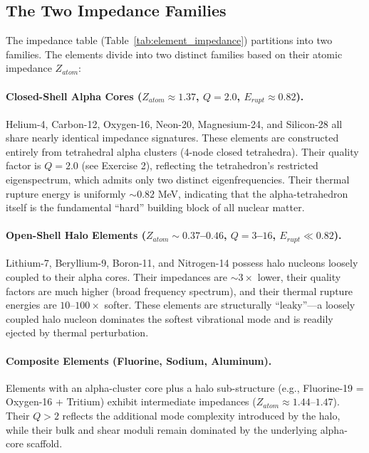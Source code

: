 \subsection{The Two Impedance Families}

The impedance table (Table~\ref{tab:element_impedance}) partitions into two families. The elements divide into two distinct families based on their atomic impedance $Z_{atom}$:

\paragraph{Closed-Shell Alpha Cores ($Z_{atom} \approx 1.37$, $Q = 2.0$, $E_{rupt} \approx 0.82$).}
Helium-4, Carbon-12, Oxygen-16, Neon-20, Magnesium-24, and Silicon-28 all share nearly identical impedance signatures. These elements are constructed entirely from tetrahedral alpha clusters (4-node closed tetrahedra). Their quality factor is $Q = 2.0$ (see Exercise 2), reflecting the tetrahedron's restricted eigenspectrum, which admits only two distinct eigenfrequencies. Their thermal rupture energy is uniformly $\sim 0.82$ MeV, indicating that the alpha-tetrahedron itself is the fundamental ``hard'' building block of all nuclear matter.

\paragraph{Open-Shell Halo Elements ($Z_{atom} \sim 0.37$--$0.46$, $Q = 3$--$16$, $E_{rupt} \ll 0.82$).}
Lithium-7, Beryllium-9, Boron-11, and Nitrogen-14 possess halo nucleons loosely coupled to their alpha cores. Their impedances are $\sim 3\times$ lower, their quality factors are much higher (broad frequency spectrum), and their thermal rupture energies are $10$--$100\times$ softer. These elements are structurally ``leaky''---a loosely coupled halo nucleon dominates the softest vibrational mode and is readily ejected by thermal perturbation.

\paragraph{Composite Elements (Fluorine, Sodium, Aluminum).}
Elements with an alpha-cluster core plus a halo sub-structure (e.g., Fluorine-19 = Oxygen-16 + Tritium) exhibit intermediate impedances ($Z_{atom} \approx 1.44$--$1.47$). Their $Q > 2$ reflects the additional mode complexity introduced by the halo, while their bulk and shear moduli remain dominated by the underlying alpha-core scaffold.

